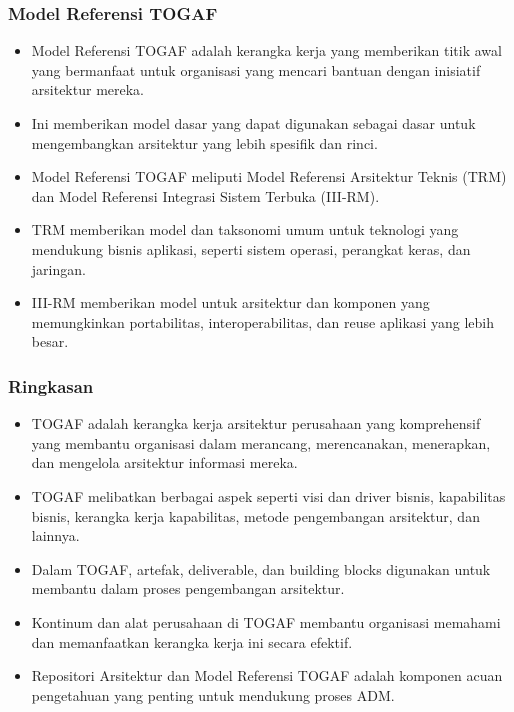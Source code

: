 \documentclass{beamer}
\begin{document}
	\begin{frame}
		\frametitle{Model Referensi TOGAF}
		\begin{itemize}
			\item Model Referensi TOGAF adalah kerangka kerja yang memberikan titik awal yang bermanfaat untuk organisasi yang mencari bantuan dengan inisiatif arsitektur mereka.
			\item Ini memberikan model dasar yang dapat digunakan sebagai dasar untuk mengembangkan arsitektur yang lebih spesifik dan rinci.
			\item Model Referensi TOGAF meliputi Model Referensi Arsitektur Teknis (TRM) dan Model Referensi Integrasi Sistem Terbuka (III-RM).
			\item TRM memberikan model dan taksonomi umum untuk teknologi yang mendukung bisnis aplikasi, seperti sistem operasi, perangkat keras, dan jaringan.
			\item III-RM memberikan model untuk arsitektur dan komponen yang memungkinkan portabilitas, interoperabilitas, dan reuse aplikasi yang lebih besar.
		\end{itemize}
	\end{frame}
	
	\begin{frame}
		\frametitle{Ringkasan}
		\begin{itemize}
			\item TOGAF adalah kerangka kerja arsitektur perusahaan yang komprehensif yang membantu organisasi dalam merancang, merencanakan, menerapkan, dan mengelola arsitektur informasi mereka.
			\item TOGAF melibatkan berbagai aspek seperti visi dan driver bisnis, kapabilitas bisnis, kerangka kerja kapabilitas, metode pengembangan arsitektur, dan lainnya.
			\item Dalam TOGAF, artefak, deliverable, dan building blocks digunakan untuk membantu dalam proses pengembangan arsitektur.
			\item Kontinum dan alat perusahaan di TOGAF membantu organisasi memahami dan memanfaatkan kerangka kerja ini secara efektif.
			\item Repositori Arsitektur dan Model Referensi TOGAF adalah komponen acuan pengetahuan yang penting untuk mendukung proses ADM.
		\end{itemize}
	\end{frame}
	
\end{document}
